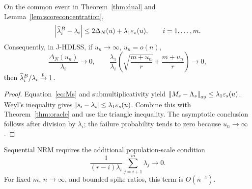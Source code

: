 \begin{theorem}\label{thm:population}
On the common event in Theorem~\ref{thm:dual} and Lemma~\ref{lem:scoreconcentration},
\begin{equation}\label{eq:populationbound}
\left\lvert\widehat{\lambda}_i^B-\lambda_i\right\rvert\le2\Delta_N(u)+\lambda_1\varepsilon_s(u),
\qquad i=1,\ldots,m.
\end{equation}
Consequently, in J-HDLSS, if $u_n\to\infty$, $u_n=o(n)$,
\begin{equation}
\frac{\Delta_N(u_n)}{\lambda_i}\to0,
\qquad
\frac{\lambda_1}{\lambda_i}\left(\sqrt{\frac{m+u_n}{r}}+\frac{m+u_n}{r}\right)\to0,
\end{equation}
then $\widehat{\lambda}_i^B/\lambda_i\xrightarrow{p}1$.
\end{theorem}
\begin{proof}
Equation~\eqref{eq:Ms} and submultiplicativity yield $\left\lVert M_s-\Lambda_s\right\rVert_{\mathrm{op}}\le\lambda_1\varepsilon_s(u)$.  Weyl's inequality gives $\left\lvert s_i-\lambda_i\right\rvert\le\lambda_1\varepsilon_s(u)$.  Combine this with Theorem~\ref{thm:oracle} and use the triangle inequality.  The asymptotic conclusion follows after division by $\lambda_i$; the failure probability tends to zero because $u_n\to\infty$.
\end{proof}

Sequential NRM requires the additional population-scale condition
\begin{equation}
\frac1{(r-i)\lambda_i}\sum_{j=i+1}^m\lambda_j\to0.
\end{equation}
For fixed $m$, $n\to\infty$, and bounded spike ratios, this term is $O(n^{-1})$.
